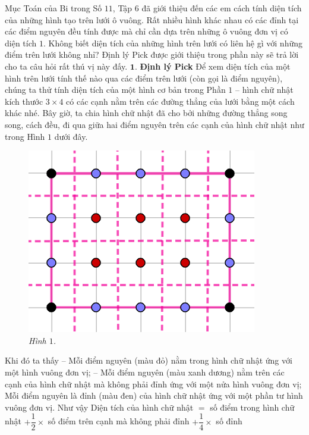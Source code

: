 \begin{multicols}{2}
	Mục Toán của Bi trong Số $11$, Tập $6$ đã giới thiệu đến các em cách tính diện tích của những hình tạo trên lưới ô vuông. Rất nhiều hình khác nhau có các đỉnh tại các điểm nguyên đều tính được mà chỉ cần dựa trên những ô vuông đơn vị có diện tích $1$. Không biết diện tích của những hình trên lưới có liên hệ gì với những điểm trên lưới không nhỉ? Định lý Pick được giới thiệu trong phần này sẽ trả lời cho ta câu hỏi rất thú vị này đấy.
	\vskip 0.1cm
	$\pmb{1.}$ \textbf{\color{toancuabi}Định lý Pick}
	\vskip 0.1cm
	Để xem diện tích của một hình trên lưới tính thế nào qua các điểm trên lưới (còn gọi là điểm nguyên), chúng ta thử tính diện tích của một hình cơ bản trong Phần $1$ -- hình chữ nhật kích thước $3\times4$ có các cạnh nằm trên các đường thẳng của lưới bằng một cách khác nhé. Bây giờ, ta chia hình chữ nhật đã cho bởi những đường thẳng song song, cách đều, đi qua giữa hai điểm nguyên trên các cạnh của hình chữ nhật như trong Hình $1$ dưới đây. 
	\begin{figure}[H]
		\vspace*{-5pt}
		\centering
		\captionsetup{labelformat= empty, justification=centering}
		\includegraphics[width= 0.62\linewidth]{1}
		\caption{\small\textit{\color{toancuabi}Hình $1$.}}
		\vspace*{-5pt}
	\end{figure}
	Khi đó ta thấy
	\vskip 0.1cm
	-- Mỗi điểm nguyên ({\color{red}màu đỏ}) nằm trong hình chữ nhật ứng với một hình vuông đơn vị;
	\vskip 0.1cm
	-- Mỗi điểm nguyên ({\color{blue}màu xanh dương}) nằm trên các cạnh của hình chữ nhật mà không phải đỉnh ứng với một nửa hình vuông đơn vị;
	\vskip 0.1cm
	Mỗi điểm nguyên là đỉnh ({\color{black}màu đen}) của hình chữ nhật ứng với một phần tư hình vuông đơn vị.
	\vskip 0.1cm
	Như vậy
	\vskip 0.1cm
	Diện tích của hình chữ nhật $=$ số điểm trong hình chữ nhật
	$+ \dfrac{1}{2}\times$ số điểm trên cạnh mà không phải đỉnh $+ \dfrac{1}{4}\times$ số đỉnh

\end{multicols}
